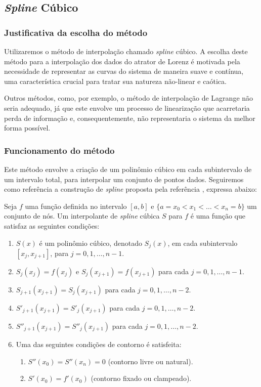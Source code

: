 \documentclass[12pt, a4paper]{article}
\begin{document}
\subsection{\textit{Spline} Cúbico}
\subsubsection{Justificativa da escolha do método}
Utilizaremos o método de interpolação chamado \textit{spline} cúbico. A
escolha deste método para a interpolação dos dados do atrator de Lorenz é
motivada pela necessidade de representar as curvas do sistema de maneira suave
e contínua, uma característica crucial para tratar sua natureza não-linear e
caótica.

Outros métodos, como, por exemplo, o método de interpolação de Lagrange
não seria adequado, já que este envolve um processo de linearização que
acarretaria perda de informação e, consequentemente, não representaria o
sistema da melhor forma possível.

\subsubsection{Funcionamento do método}
Este método envolve a criação de um polinômio cúbico em cada subintervalo
de um intervalo total, para interpolar um conjunto de pontos dados. Seguiremos
como referência a construção de \textit{spline} proposta pela referência
\cite{burden2016}, expressa abaixo:

Seja $f$ uma função definida no intervalo $[a,b]$ e $ \{a = x_0 < x_1 <
    \ldots < x_n = b\}$ um conjunto de nós. Um interpolante de \textit{spline}
cúbica $S$ para $f$ é uma função que satisfaz as seguintes condições:
\begin{enumerate}
    \item $ S(x) $ é um polinômio cúbico, denotado $ S_j(x) $, em cada
          subintervalo $[x_j, x_{j+1}]$, para $ j = 0, 1, \ldots, n-1 $.
    \item $ S_j(x_j) = f(x_j) $ e $ S_j(x_{j+1}) = f(x_{j+1}) $ para cada $
              j = 0, 1, \ldots, n-1 $.
    \item $ S_{j+1}(x_{j+1}) = S_j(x_{j+1}) $ para cada $ j = 0, 1, \ldots,
              n-2 $.
    \item $ S'_{j+1}(x_{j+1}) = S'_j(x_{j+1}) $ para cada $ j = 0, 1,
              \ldots, n-2 $.
    \item $ S''_{j+1}(x_{j+1}) = S''_j(x_{j+1}) $ para cada $ j = 0, 1,
              \ldots, n-2 $.
    \item Uma das seguintes condições de contorno é satisfeita:
          \begin{enumerate}
              \item $S''(x_0) = S''(x_n) = 0$ (contorno livre ou natural).
              \item $S'(x_0) = f'(x_0)$ (contorno fixado ou clampeado).
          \end{enumerate}
\end{enumerate}
\end{document}
